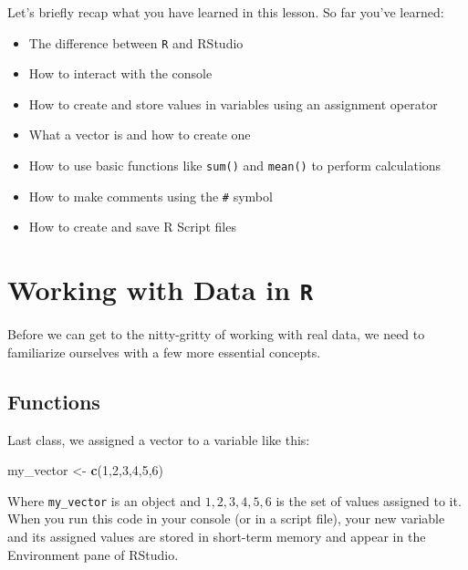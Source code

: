 \documentclass[
]{book}
\newenvironment{Shaded}{\begin{snugshade}}{\end{snugshade}}
\newcommand{\DecValTok}[1]{\textcolor[rgb]{0.00,0.00,0.81}{#1}}
\newcommand{\FunctionTok}[1]{\textcolor[rgb]{0.13,0.29,0.53}{\textbf{#1}}}
\newcommand{\NormalTok}[1]{#1}
\newcommand{\OtherTok}[1]{\textcolor[rgb]{0.56,0.35,0.01}{#1}}
\providecommand{\tightlist}{%
  \setlength{\itemsep}{0pt}\setlength{\parskip}{0pt}}
\begin{document}
Let's briefly recap what you have learned in this lesson. So far you've learned:

\begin{itemize}
\tightlist
\item
  The difference between \texttt{R} and RStudio
\item
  How to interact with the console
\item
  How to create and store values in variables using an assignment operator
\item
  What a vector is and how to create one
\item
  How to use basic functions like \texttt{sum()} and \texttt{mean()} to perform calculations
\item
  How to make comments using the \texttt{\#} symbol
\item
  How to create and save R Script files
\end{itemize}

\hypertarget{working-with-data-in-r}{%
\chapter{\texorpdfstring{Working with Data in \texttt{R}}{Working with Data in R}}\label{working-with-data-in-r}}

Before we can get to the nitty-gritty of working with real data, we need to familiarize ourselves with a few more essential concepts.

\hypertarget{functions}{%
\section{Functions}\label{functions}}

Last class, we assigned a vector to a variable like this:

\begin{Shaded}
\begin{Highlighting}[]
\NormalTok{my\_vector }\OtherTok{\textless{}{-}} \FunctionTok{c}\NormalTok{(}\DecValTok{1}\NormalTok{,}\DecValTok{2}\NormalTok{,}\DecValTok{3}\NormalTok{,}\DecValTok{4}\NormalTok{,}\DecValTok{5}\NormalTok{,}\DecValTok{6}\NormalTok{)}
\end{Highlighting}
\end{Shaded}

Where \texttt{my\_vector} is an object and \({1,2,3,4,5,6}\) is the set of values assigned to it. When you run this code in your console (or in a script file), your new variable and its assigned values are stored in short-term memory and appear in the Environment pane of RStudio.
\end{document}

